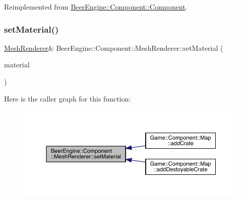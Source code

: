Reimplemented from \mbox{\hyperlink{class_beer_engine_1_1_component_1_1_component_a4d82d8a6b22b93514e0585fa4073041f}{Beer\+Engine\+::\+Component\+::\+Component}}.

\mbox{\label{class_beer_engine_1_1_component_1_1_mesh_renderer_a9d4408a8c5e670c130394c59eeb5ccf2}} 
\subsubsection{\texorpdfstring{set\+Material()}{setMaterial()}}
{\footnotesize\ttfamily \mbox{\hyperlink{class_beer_engine_1_1_component_1_1_mesh_renderer}{Mesh\+Renderer}}\& Beer\+Engine\+::\+Component\+::\+Mesh\+Renderer\+::set\+Material (\begin{DoxyParamCaption}\item[{\mbox{\hyperlink{class_beer_engine_1_1_graphics_1_1_a_material}{Graphics\+::\+A\+Material}} $\ast$}]{material }\end{DoxyParamCaption})}

Here is the caller graph for this function\+:
\nopagebreak
\begin{figure}[H]
\begin{center}
\leavevmode
\includegraphics[width=350pt]{class_beer_engine_1_1_component_1_1_mesh_renderer_a9d4408a8c5e670c130394c59eeb5ccf2_icgraph}
\end{center}
\end{figure}
\mbox{\label{class_beer_engine_1_1_component_1_1_mesh_renderer_a818276a7fe8703a04bf431a41fa4c907}} 
